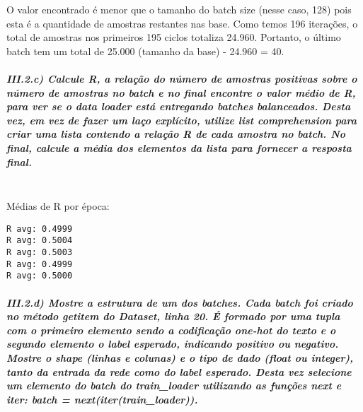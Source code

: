 \documentclass[11pt]{article}
\begin{document}
O valor encontrado é menor que o tamanho do batch size (nesse caso, 128)
pois esta é a quantidade de amostras restantes nas base. Como temos 196
iterações, o total de amostras nos primeiros 195 ciclos totaliza 24.960.
Portanto, o último batch tem um total de 25.000 (tamanho da base) -
24.960 = 40.

\subparagraph{III.2.c) Calcule R, a relação do número de amostras
positivas sobre o número de amostras no batch e no final encontre o
valor médio de R, para ver se o data loader está entregando batches
balanceados. Desta vez, em vez de fazer um laço explícito, utilize list
comprehension para criar uma lista contendo a relação R de cada amostra
no batch. No final, calcule a média dos elementos da lista para fornecer
a resposta
final.}\label{iii.2.c-calcule-r-a-relauxe7uxe3o-do-nuxfamero-de-amostras-positivas-sobre-o-nuxfamero-de-amostras-no-batch-e-no-final-encontre-o-valor-muxe9dio-de-r-para-ver-se-o-data-loader-estuxe1-entregando-batches-balanceados.-desta-vez-em-vez-de-fazer-um-lauxe7o-expluxedcito-utilize-list-comprehension-para-criar-uma-lista-contendo-a-relauxe7uxe3o-r-de-cada-amostra-no-batch.-no-final-calcule-a-muxe9dia-dos-elementos-da-lista-para-fornecer-a-resposta-final.}\mbox{} \\

Médias de R por época:

\begin{verbatim}
R avg: 0.4999
R avg: 0.5004
R avg: 0.5003
R avg: 0.4999
R avg: 0.5000
\end{verbatim}

\subparagraph{\texorpdfstring{III.2.d) Mostre a estrutura de um dos
batches. Cada batch foi criado no método \textbf{getitem} do Dataset,
linha 20. É formado por uma tupla com o primeiro elemento sendo a
codificação one-hot do texto e o segundo elemento o label esperado,
indicando positivo ou negativo. Mostre o shape (linhas e colunas) e o
tipo de dado (float ou integer), tanto da entrada da rede como do label
esperado. Desta vez selecione um elemento do batch do train\_loader
utilizando as funções next e iter: batch =
next(iter(train\_loader)).}{III.2.d) Mostre a estrutura de um dos batches. Cada batch foi criado no método getitem do Dataset, linha 20. É formado por uma tupla com o primeiro elemento sendo a codificação one-hot do texto e o segundo elemento o label esperado, indicando positivo ou negativo. Mostre o shape (linhas e colunas) e o tipo de dado (float ou integer), tanto da entrada da rede como do label esperado. Desta vez selecione um elemento do batch do train\_loader utilizando as funções next e iter: batch = next(iter(train\_loader)).}}\label{iii.2.d-mostre-a-estrutura-de-um-dos-batches.-cada-batch-foi-criado-no-muxe9todo-getitem-do-dataset-linha-20.-uxe9-formado-por-uma-tupla-com-o-primeiro-elemento-sendo-a-codificauxe7uxe3o-one-hot-do-texto-e-o-segundo-elemento-o-label-esperado-indicando-positivo-ou-negativo.-mostre-o-shape-linhas-e-colunas-e-o-tipo-de-dado-float-ou-integer-tanto-da-entrada-da-rede-como-do-label-esperado.-desta-vez-selecione-um-elemento-do-batch-do-train_loader-utilizando-as-funuxe7uxf5es-next-e-iter-batch-nextitertrain_loader.}\mbox{} \\
\end{document}

